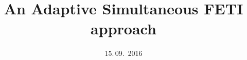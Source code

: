 
\usepackage{booktabs}
\usepackage{pdflscape}
\usepackage{longtable}
\usepackage{footnote}
\usepackage{import}
\usepackage{subcaption}
\usepackage{mycommands}


\usepackage{amsmath}
\usepackage{amsfonts}
\usepackage{amssymb}

\usepackage{graphicx}
\usepackage{pgfplots}
\usepackage{pgfplotstable}


\usepackage{struktex}

\usepackage{kbordermatrix}
\usepackage{blkarray}%

\usepackage[font={small,it}]{caption}

\usepackage[outline]{contour}












\author{}
\title{An Adaptive Simultaneous FETI approach}
\date{15.\,09.~2016}
